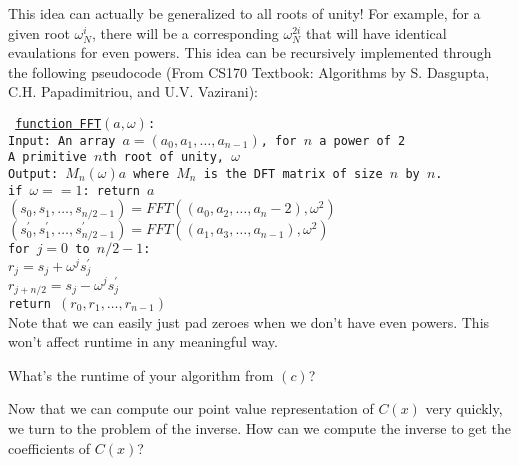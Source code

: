 \begin{enumerate}
{  \vspace{2mm}

  This idea can actually be generalized to all roots of unity! For example, for a given root $\omega_{N}^{i}$, there will be a corresponding $\omega_{N}^{2i}$ that will have identical evaulations for even powers. This idea can be recursively implemented through the following pseudocode (From CS170 Textbook: Algorithms by S. Dasgupta, C.H. Papadimitriou, and U.V. Vazirani):

  \texttt{\noindent
    \underline{function FFT}$(a, \omega)$:\\
    Input: An array $a = (a_{0}, a_{1}, \dots, a_{n-1})$, for $n$ a power of 2\\
    \hphantom{Input:}  A primitive $n$th root of unity, $\omega$\\
    Output: $M_{n}(\omega)a$ where $M_{n}$ is the DFT matrix of size $n$ by $n$.\\
    if $\omega == 1$: return $a$\\
    $(s_0, s_1, \dots, s_{n/2 - 1}) = FFT((a_0, a_2, \dots, a_n-2), \omega^{2})$\\
    $(s_{0}^{\prime}, s_{1}^{\prime}, \dots, s_{n/2 - 1}^{\prime}) = FFT((a_1, a_3, \dots, a_{n-1}), \omega^{2})$\\
    for $j = 0$ to $n/2 - 1$:\\
    \hphantom{for} $r_{j} = s_{j} + \omega^{j}s_{j}^{\prime}$\\
    \hphantom{for} $r_{j+n/2} = s_{j} - \omega^{j}s_{j}^{\prime}$\\
    return $(r_0, r_1, \dots, r_{n-1})$\\
  }
  Note that we can easily just pad zeroes when we don't have even powers. This won't affect runtime in any meaningful way.
}

\qitem
What's the runtime of your algorithm from $(c)$?


\qitem
Now that we can compute our point value representation of $C(x)$ very quickly, we turn to the problem of the inverse. How can we compute the inverse to get the coefficients of $C(x)$?


\end{enumerate}
